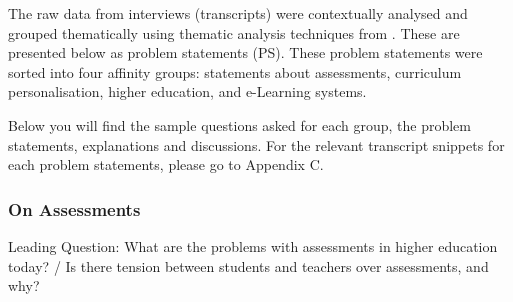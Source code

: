 The raw data from interviews (transcripts) were contextually analysed and grouped thematically 
using thematic analysis techniques from \citet{clarke2014thematic}.
These are presented below as problem statements (PS).
These problem statements were sorted into four affinity groups: statements about assessments,
curriculum personalisation, higher education, and e-Learning systems.
 
Below you will find the sample questions asked for each group,
the problem statements, explanations and discussions.
For the relevant transcript snippets for each problem statements, please go to Appendix C.

\subsubsection{On Assessments}

Leading Question: What are the problems with assessments in higher education today? /
Is there tension between students and teachers over assessments, and why?

